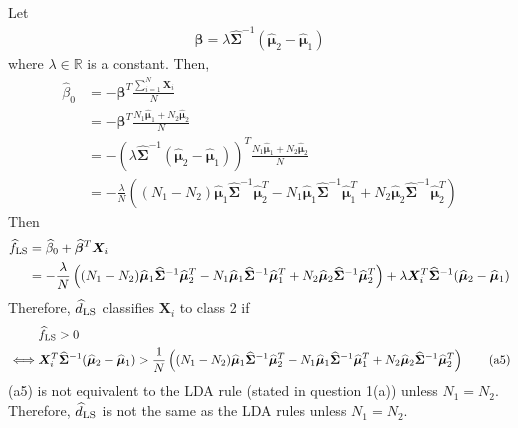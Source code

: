 \documentclass[10pt]{article}
\theoremstyle{definition}
\theoremstyle{remark}
\newcommand{\bX}{\bm{X}}
\newcommand{\bbeta}{\bm{\beta}}
\newcommand{\bmu}{\bm{\mu}}
\newcommand{\bSigma}{\bm{\Sigma}}
\newcommand{\bbR}{\mathbb{R}}
\begin{document}
\begin{enumerate}
\begin{itemize}
		Let
		\begin{align*}
		\widehat{\bbeta} = \lambda \widehat{\bSigma}^{-1}(\widehat{\bmu}_{2} - \widehat{\bmu}_{1})
		\end{align*}
		where $ \lambda \in \bbR $ is a constant. Then,
		\begin{align*}
		    \widehat{\beta}_{0} & = - \bbeta^T \frac{\sum_{i=1}^{N}\bX_{i}}{N} \\
		    & = - \bbeta^T \frac{N_1\widehat{\bmu}_{1} + N_2\widehat{\bmu}_{2}}{N} \\
		    & = - \left( \lambda \widehat{\bSigma}^{-1}(\widehat{\bmu}_{2} - \widehat{\bmu}_{1}) \right)^T \frac{N_1\widehat{\bmu}_{1} + N_2\widehat{\bmu}_{2}}{N} \\
		    & = -\frac{\lambda}{N} \left( (N_1-N_2) \widehat{\bmu}_{1} \widehat{\bSigma}^{-1} \widehat{\bmu}_{2}^T - N_1 \widehat{\bmu}_{1} \widehat{\bSigma}^{-1} \widehat{\bmu}_{1}^T + N_2 \widehat{\bmu}_{2} \widehat{\bSigma}^{-1} \widehat{\bmu}_{2}^T \right)
		\end{align*}
		Then
		\begin{align*}
		    \widehat{f}_{\rm LS} & = \widehat{\beta}_{0} + \widehat{\bbeta}^T\bX_i \\ 
		    & = -\frac{\lambda}{N} \left( (N_1-N_2) \widehat{\bmu}_{1} \widehat{\bSigma}^{-1} \widehat{\bmu}_{2}^T - N_1 \widehat{\bmu}_{1} \widehat{\bSigma}^{-1} \widehat{\bmu}_{1}^T + N_2 \widehat{\bmu}_{2} \widehat{\bSigma}^{-1} \widehat{\bmu}_{2}^T \right) + \lambda \bX_i^T \widehat{\bSigma}^{-1}(\widehat{\bmu}_{2} - \widehat{\bmu}_{1}) 
		\end{align*}
		Therefore, $ \widehat{d}_{\rm LS} $ classifies $\bX_i$ to class 2 if
		\begin{align*}
		    & \widehat{f}_{\rm LS} > 0 \\ 
		    \iff & \bX_i^T \widehat{\bSigma}^{-1}(\widehat{\bmu}_{2} - \widehat{\bmu}_{1}) > \frac{1}{N} \left( (N_1-N_2) \widehat{\bmu}_{1} \widehat{\bSigma}^{-1} \widehat{\bmu}_{2}^T - N_1 \widehat{\bmu}_{1} \widehat{\bSigma}^{-1} \widehat{\bmu}_{1}^T + N_2 \widehat{\bmu}_{2} \widehat{\bSigma}^{-1} \widehat{\bmu}_{2}^T \right) \tag{a5}
		\end{align*}
		(a5) is not equivalent to the LDA rule (stated in question 1(a)) unless $N_1=N_2$. Therefore, $ \widehat{d}_{\rm LS} $ is not the same as the LDA rules unless $ N_{1} = N_{2} $.
	\end{itemize}


\end{enumerate}
\end{document}
